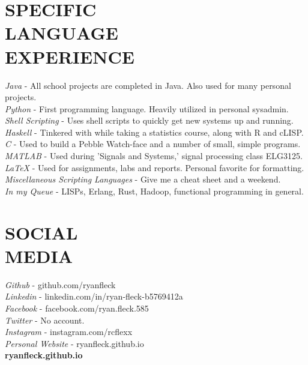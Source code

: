 \documentclass[margin]{res}
\begin{document}
\begin{resume}
 
\section{SPECIFIC \\ LANGUAGE \\ EXPERIENCE}        
{\sl Java} - All school projects are completed in Java. Also used for many personal projects.\\
{\sl Python} - First programming language. Heavily utilized in personal sysadmin.\\
{\sl Shell Scripting} - Uses shell scripts to quickly get new systems up and running.\\
{\sl Haskell} -  Tinkered with while taking a statistics course, along with R and cLISP.\\
{\sl C} - Used to build a Pebble Watch-face and a number of small, simple programs.\\
{\sl MATLAB} - Used during 'Signals and Systems,' signal processing class ELG3125.\\
{\sl LaTeX} -  Used for assignments, labs and reports. Personal favorite for formatting.\\
{\sl Miscellaneous Scripting Languages} -  Give me a cheat sheet and a weekend.\\
{\sl In my Queue} - LISPs, Erlang, Rust, Hadoop, functional programming in general.
           	
\section{SOCIAL \\ MEDIA}        
{\sl Github} - github.com/ryanfleck \\
{\sl Linkedin} - linkedin.com/in/ryan-fleck-b5769412a \\
{\sl Facebook} - facebook.com/ryan.fleck.585 \\
{\sl Twitter} - No account. \\
{\sl Instagram} - instagram.com/rcflexx \\
{\sl Personal Website} - ryanfleck.github.io \\
 
 \vfill
 {\hfill\large\bf ryanfleck.github.io}
 

\end{resume}
\end{document}
